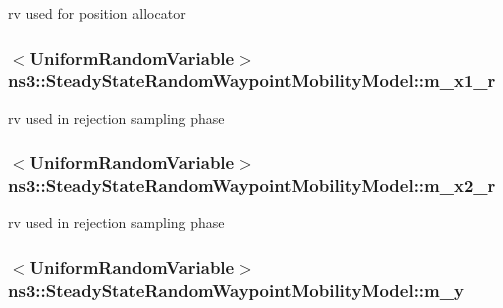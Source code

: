 rv used for position allocator 

\subsubsection[{\texorpdfstring{m\+\_\+x1\+\_\+r}{m_x1_r}}]{$<${\bf Uniform\+Random\+Variable}$>$ ns3\+::\+Steady\+State\+Random\+Waypoint\+Mobility\+Model\+::m\+\_\+x1\+\_\+r\hspace{0.3cm}{\ttfamily [private]}}\hypertarget{classns3_1_1SteadyStateRandomWaypointMobilityModel_a8b25948c226f0b28f5f958fa32157877}{}\label{classns3_1_1SteadyStateRandomWaypointMobilityModel_a8b25948c226f0b28f5f958fa32157877}


rv used in rejection sampling phase 

\subsubsection[{\texorpdfstring{m\+\_\+x2\+\_\+r}{m_x2_r}}]{$<${\bf Uniform\+Random\+Variable}$>$ ns3\+::\+Steady\+State\+Random\+Waypoint\+Mobility\+Model\+::m\+\_\+x2\+\_\+r\hspace{0.3cm}{\ttfamily [private]}}\hypertarget{classns3_1_1SteadyStateRandomWaypointMobilityModel_a4d9efa1dda69dcb5aa455643e9524edb}{}\label{classns3_1_1SteadyStateRandomWaypointMobilityModel_a4d9efa1dda69dcb5aa455643e9524edb}


rv used in rejection sampling phase 

\subsubsection[{\texorpdfstring{m\+\_\+y}{m_y}}]{$<${\bf Uniform\+Random\+Variable}$>$ ns3\+::\+Steady\+State\+Random\+Waypoint\+Mobility\+Model\+::m\+\_\+y\hspace{0.3cm}{\ttfamily [private]}}\hypertarget{classns3_1_1SteadyStateRandomWaypointMobilityModel_a59fec0567f9834913a50f0d697cf409b}{}\label{classns3_1_1SteadyStateRandomWaypointMobilityModel_a59fec0567f9834913a50f0d697cf409b}


